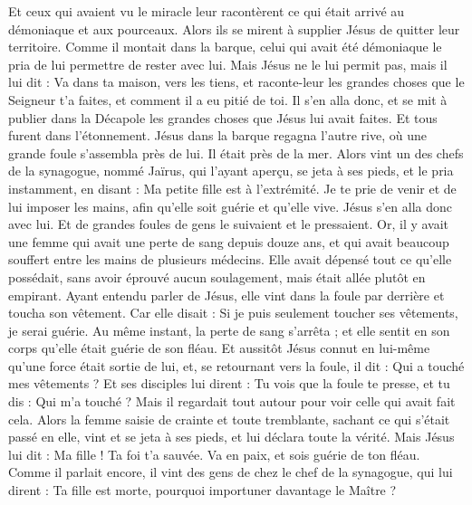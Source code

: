 \begin{multicols}{2}
Et ceux qui avaient vu le miracle leur racontèrent ce qui était arrivé au démoniaque et aux pourceaux.
Alors ils se mirent à supplier Jésus de quitter leur territoire.
Comme il montait dans la barque, celui qui avait été démoniaque le pria de lui permettre de rester avec lui.
Mais Jésus ne le lui permit pas, mais il lui dit : Va dans ta maison, vers les tiens, et raconte-leur les grandes choses que le Seigneur t'a faites, et comment il a eu pitié de toi.
Il s'en alla donc, et se mit à publier dans la Décapole les grandes choses que Jésus lui avait faites. Et tous furent dans l’étonnement.
Jésus dans la barque regagna l’autre rive, où une grande foule s’assembla près de lui. Il était près de la mer.
Alors vint un des chefs de la synagogue, nommé Jaïrus, qui l’ayant aperçu, se jeta à ses pieds,
et le pria instamment, en disant : Ma petite fille est à l'extrémité. Je te prie de venir et de lui imposer les mains, afin qu'elle soit guérie et qu'elle vive.
Jésus s'en alla donc avec lui. Et de grandes foules de gens le suivaient et le pressaient.
Or, il y avait une femme qui avait une perte de sang depuis douze ans,
et qui avait beaucoup souffert entre les mains de plusieurs médecins. Elle avait dépensé tout ce qu’elle possédait, sans avoir éprouvé aucun soulagement, mais était allée plutôt en empirant.
Ayant entendu parler de Jésus, elle vint dans la foule par derrière et toucha son vêtement.
Car elle disait : Si je puis seulement toucher ses vêtements, je serai guérie.
Au même instant, la perte de sang s'arrêta ; et elle sentit en son corps qu'elle était guérie de son fléau.
Et aussitôt Jésus connut en lui-même qu’une force était sortie de lui, et, se retournant vers la foule, il dit : Qui a touché mes vêtements ?
Et ses disciples lui dirent : Tu vois que la foule te presse, et tu dis : Qui m'a touché ?
Mais il regardait tout autour pour voir celle qui avait fait cela.
Alors la femme saisie de crainte et toute tremblante, sachant ce qui s’était passé en elle, vint et se jeta à ses pieds, et lui déclara toute la vérité.
Mais Jésus lui dit : Ma fille ! Ta foi t'a sauvée. Va en paix, et sois guérie de ton fléau.
Comme il parlait encore, il vint des gens de chez le chef de la synagogue, qui lui dirent : Ta fille est morte, pourquoi importuner davantage le Maître ?

\end{multicols}
